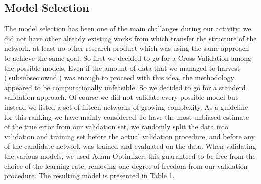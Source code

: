 \subsection{Model Selection}
The model selection has been one of the main challanges during our activity: we did not have other already existing works from which transfer the structure of the network, at least no other research product which was using the same approach to achieve the same goal. So first we decided to go for a Cross Validation among the possible models. Even if the amount of data that we managed to harvest (\ref{subsubsec:ownd}) was enough to proceed with this idea, the methodology appeared to be computationally unfeasible. So we decided to go for a standerd validation approach. Of course we did not validate every possible model but instead we listed a set of fifteen networks of growing complexity. As a guideline for this ranking we have mainly considered 
To have the most unbiased estimate of the true error from our validation set, we randomly split the data into validation and training set before the actual validation procedure, and before any of the candidate network was trained and evaluated on the data.
When validating the various models, we used Adam Optimizer: this guaranteed to be free from the choice of the learning rate, removing one degree of freedom from our validation procedure.
The resulting model is presented in Table 1.
\\
